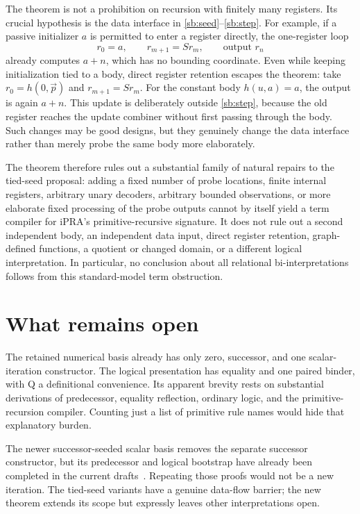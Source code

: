 \documentclass[11pt,letterpaper]{article}
\theoremstyle{definition}\newtheorem{definition}[theorem]{Definition}
\theoremstyle{remark}\newtheorem{remark}[theorem]{Remark}
\begin{document}
The theorem is not a prohibition on recursion with finitely many
registers.  Its crucial hypothesis is the data interface in
\eqref{sb:seed}--\eqref{sb:step}.  For example, if a passive initializer
$a$ is permitted to enter a register directly, the one-register loop
\[
             r_0=a,\qquad r_{m+1}=Sr_m,
             \qquad\text{output }r_n
\]
already computes $a+n$, which has no bounding coordinate.  Even while keeping initialization tied to a body, direct register
retention escapes the theorem: take $r_0=h(0,\vec p)$ and
$r_{m+1}=Sr_m$.  For the constant body $h(u,a)=a$, the output is again
$a+n$.  This update is deliberately outside \eqref{sb:step}, because
the old register reaches the update combiner without first passing
through the body.  Such changes may be good designs, but they genuinely
change the data interface rather than merely probe the same body more
elaborately.

The theorem therefore rules out a substantial family of natural repairs
to the tied-seed proposal: adding a fixed number of probe locations,
finite internal registers, arbitrary unary decoders, arbitrary bounded
observations, or more elaborate fixed processing of the probe outputs
cannot by itself yield a term compiler for iPRA's primitive-recursive
signature.  It does not rule out a second independent body, an independent
data input, direct register retention, graph-defined functions, a quotient
or changed domain, or a different logical interpretation.  In particular,
no conclusion about all relational bi-interpretations follows from this
standard-model term obstruction.



\section{What remains open}

The retained numerical basis already has only zero, successor, and one
scalar-iteration constructor. The logical presentation has equality and
one paired binder, with Q a definitional convenience. Its apparent brevity
rests on substantial derivations of predecessor, equality reflection,
ordinary logic, and the primitive-recursion compiler. Counting just a
list of primitive rule names would hide that explanatory burden.

The newer successor-seeded scalar basis removes the separate successor
constructor, but its predecessor and logical bootstrap have already been
completed in the current drafts~\cite{scalar,completion,transient}.
Repeating those proofs would not be a new iteration. The tied-seed
variants have a genuine data-flow barrier; the new theorem extends its
scope but expressly leaves other interpretations open.
\end{document}
